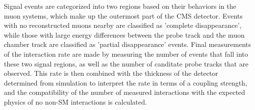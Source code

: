 Signal events are categorized into two regions based on their behaviors in the muon systems, which make up the outermost part of the CMS detector. 
Events with no reconstructed muons nearby are classified as 'complete disappearance', while those with large energy differences between the probe track and the muon chamber track are classified as 'partial disappearance' events.
Final measurements of the interaction rate are made by measuring the number of events that fall into these two signal regions, as well as the number of canditate probe tracks that are observed.
This rate is then combined with the thickness of the detector determined from simulation to interpret the rate in terms of a coupling strength, and the compatibility of the number of measured interactions with the expected physics of no non-SM interactions is calculated. 

